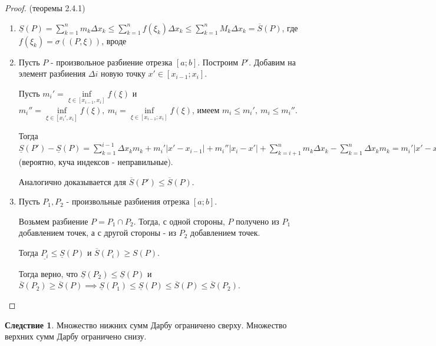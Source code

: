 \documentclass{report}
\theoremstyle{definition}
\newtheorem*{effect}{Следствие}
\begin{document}
\begin{proof}
  (теоремы 2.4.1)

  \begin{enumerate}
    \item $\underline{S}(P) = \sum_{k=1}^{n}m_{k}\Delta x_{k} \leqslant \sum_{k=1}^{n}f(\xi_{k})
            \Delta x_{k} \leqslant \sum_{k=1}^{n}M_{k}\Delta x_{k} = \overline{S}(P)$, где $f(\xi_{k}) =
            \sigma((P,\xi))$, вроде
    \item Пусть $P$ - произвольное разбиение отрезка $[a;b]$. Построим $P'$. Добавим на элемент
    разбиения $\Delta i$ новую точку $x'\in [x_{i-1};x_{i}]$.

    Пусть $m_{i}' = \underset{\xi\in[x_{i-1},x_{i}]}{\inf}f(\xi)$ и $m_{i}'' = \underset
    {\xi\in[x_{i}',x_{i}]}{\inf}f(\xi), \ m_{i} = \underset{\xi\in[x_{i-1};x_{i}]}{\inf}f(\xi)$,
    имеем $m_{i}\leqslant m_{i}', \ m_{i} \leqslant m_{i}''$.

    Тогда $\underline{S}(P') - \underline{S}(P) = \sum_{k=1}^{i-1}\Delta x_{k}m_{k} +
    m_{i}' | x' - x_{i-1} | + m_{i}''| x_{i} - x' | + \sum_{k=i+1}^{n}m_{k}\Delta x_{k} - \sum_{k=1}^{n}
    \Delta x_{k}m_{k} = m_{i}'| x' - x_{i-1} | + m_{i}''| x_{i} - x' | - m_{i}\Delta x_{i} \geqslant 0
    \implies \underline{S}(P') \geqslant S(P)$ (вероятно, куча индексов - неправильные).

    Аналогично доказывается для $\overline{S}(P')\leqslant\overline{S}(P)$.
    \item Пусть $P_{1},P_{2}$ - произвольные разбиения отрезка $[a;b]$.
    
    Возьмем разбиение $P = P_{1}\cap P_{2}$. Тогда, с одной стороны, $P$ получено из $P_{1}$ добавлением
    точек, а с другой стороны - из $P_{2}$ добавлением точек.

    Тогда $\underline{P_{i}} \leqslant \underline{S}(P)$ и $\overline{S}(P_{i})\geqslant S(P)$.

    Тогда верно, что $\underline{S}(P_{2})\leqslant \underline{S}(P)$ и $\overline{S}(P_{2})
    \geqslant \overline{S}(P) \implies \underline{S}(P_{1}) \leqslant \underline{S}(P) \leqslant
    \overline{S}(P)\leqslant \overline{S}(P_{2})$.
  \end{enumerate}
\end{proof}

\begin{effect}
  Множество нижних сумм Дарбу ограничено сверху. Множество верхних сумм Дарбу ограничено снизу.
\end{effect}
\end{document}

